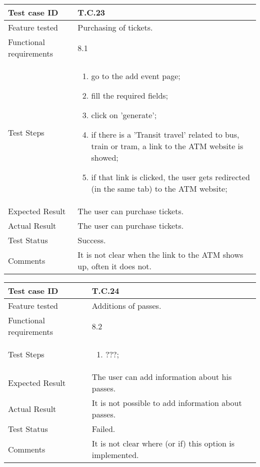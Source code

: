 \begin{table}[H]
	\begin{center}
		\begin{tabular}{ | p{} | p{} | }
		\hline
		Test case ID & T.C.23\\
		\hline
		Feature tested & Purchasing of tickets.\\
    	\hline
		Functional requirements & 8.1  \\
		\hline
		Test Steps & 
			\begin{enumerate}
				\item go to the add event page;
				\item fill the required fields;
				\item click on 'generate';
				\item if there is a 'Transit travel' related to bus, train or tram, a link to the ATM website is showed;
				\item if that link is clicked, the user gets redirected (in the same tab) to the ATM website;
			\end{enumerate} \\
		\hline
		Expected Result & The user can purchase tickets.\\
		\hline
		Actual Result & The user can purchase tickets.\\ 
		\hline
		Test Status & \color{ForestGreen}Success.\\ 
		\hline
		Comments & It is not clear when the link to the ATM shows up, often it does not. \\ 
		\hline
		
		\end{tabular}
	\end{center}
\end{table}

\begin{table}[H]
	\begin{center}
		\begin{tabular}{ | p{} | p{} | }
		\hline
		Test case ID & T.C.24\\
		\hline
		Feature tested & Additions of passes.\\
    	\hline
		Functional requirements & 8.2  \\
		\hline
		Test Steps & 
			\begin{enumerate}
				\item ???;
			\end{enumerate} \\
		\hline
		Expected Result & The user can add information about his passes.\\
		\hline
		Actual Result & It is not possible to add information about passes.\\ 
		\hline
		Test Status & \color{Red}Failed.\\ 
		\hline
		Comments & It is not clear where (or if) this option is implemented. \\ 
		\hline
		
		\end{tabular}
	\end{center}
\end{table}

